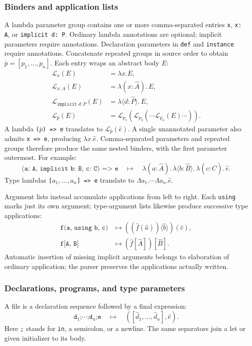 \documentclass[10pt,a4paper]{article}
\newcommand{\iarg}[1]{\langle#1\rangle}
\newcommand{\ilam}[3]{\lambda\langle#1:#2\rangle.\,#3}
\newcommand{\lam}[3]{\lambda(#1:#2).\,#3}
\begin{document}
\subsubsection*{Binders and application lists}
A lambda parameter group contains one or more comma-separated entries
\texttt{x}, \texttt{x: A}, or \texttt{implicit d: P}. Ordinary lambda annotations are optional;
implicit parameters require annotations. Declaration parameters in \texttt{def} and
\texttt{instance} require annotations. Concatenate repeated groups in source order
to obtain $\bar p=[p_1,\ldots,p_n]$. Each entry wraps an abstract body $E$:
\[
\begin{aligned}
\mathcal L_x(E)&=\lambda x.E,\\
\mathcal L_{x:A}(E)&=\lam{x}{\hat A}{E},\\
\mathcal L_{\texttt{implicit }d:P}(E)&=\ilam{d}{\hat P}{E},\\
\mathcal L_{\bar p}(E)&=
 \mathcal L_{p_1}(\mathcal L_{p_2}(\cdots\mathcal L_{p_n}(E)\cdots)).
\end{aligned}
\]
A lambda \texttt{(}$\bar p$\texttt{) => e} translates to $\mathcal L_{\bar p}(\hat e)$.
A single unannotated parameter also admits \texttt{x => e}, producing $\lambda x.\hat e$.
Comma-separated parameters and repeated groups therefore produce the same nested binders,
with the first parameter outermost. For example:
\[
\texttt{(a: A, implicit b: B, c: C) => e}
 \quad\longmapsto\quad
 \lam{a}{\hat A}{\ilam{b}{\hat B}{\lam{c}{\hat C}{\hat e}}}.
\]
Type lambdas \texttt{[}$a_1,\ldots,a_n$\texttt{] => e} translate to
$\Lambda a_1.\cdots\Lambda a_n.\hat e$.

Argument lists instead accumulate applications from left to right. Each \texttt{using}
marks just its own argument; type-argument lists likewise produce successive type applications:
\[
\begin{aligned}
\texttt{f(a, using b, c)}&\longmapsto ((\hat f(\hat a))\iarg{\hat b})(\hat c),\\
\texttt{f[A, B]}&\longmapsto(\hat f[\hat A])[\hat B].
\end{aligned}
\]
Automatic insertion of missing implicit arguments belongs to elaboration of ordinary
application; the parser preserves the applications actually written.

\subsubsection*{Declarations, programs, and type parameters}
A file is a declaration sequence followed by a final expression:
\[
 \texttt{d}_1\texttt{;}\cdots\texttt{;}\texttt{d}_n\texttt{;}\texttt{e}
 \quad\longmapsto\quad ([\hat d_1,\ldots,\hat d_n],\hat e).
\]
Here \texttt{;} stands for \texttt{in}, a semicolon, or a newline. The same separators
join a let or given initializer to its body.
\end{document}
